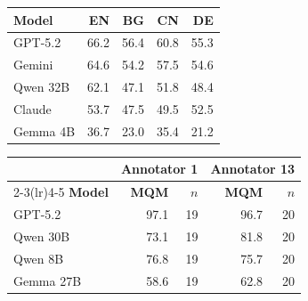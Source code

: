 \vspace{6pt}
\noindent
\begin{minipage}[t]{0.48\textwidth}
\scriptsize
{}\label{tab:crosslingual}
\begin{tabular}{@{}l rrrr@{}}
\toprule
\textbf{Model} & \textbf{EN} & \textbf{BG} & \textbf{CN} & \textbf{DE} \\
\midrule
GPT-5.2     & 66.2 & 56.4 & 60.8 & 55.3 \\
Gemini      & 64.6 & 54.2 & 57.5 & 54.6 \\
Qwen 32B    & 62.1 & 47.1 & 51.8 & 48.4 \\
Claude      & 53.7 & 47.5 & 49.5 & 52.5 \\
Gemma 4B    & 36.7 & 23.0 & 35.4 & 21.2 \\
\bottomrule
\end{tabular}
\end{minipage}\hfill
\begin{minipage}[t]{0.48\textwidth}
\scriptsize
{}\label{tab:human-per-annotator}
\begin{tabular}{@{}l rr rr@{}}
\toprule
 & \multicolumn{2}{c}{\textbf{Annotator 1}} & \multicolumn{2}{c}{\textbf{Annotator 13}} \\
\cmidrule(lr){2-3}\cmidrule(lr){4-5}
\textbf{Model} & \textbf{MQM} & $n$ & \textbf{MQM} & $n$ \\
\midrule
GPT-5.2     & 97.1 & 19 & 96.7 & 20 \\
Qwen 30B    & 73.1 & 19 & 81.8 & 20 \\
Qwen 8B     & 76.8 & 19 & 75.7 & 20 \\
Gemma 27B   & 58.6 & 19 & 62.8 & 20 \\
\bottomrule
\end{tabular}
\end{minipage}

